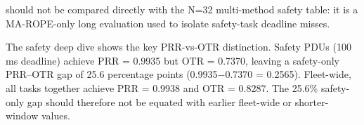  should not be compared directly with the N=32 multi-method safety table: it is a MA-ROPE-only long evaluation used to isolate safety-task deadline misses.

The safety deep dive shows the key PRR-vs-OTR distinction. Safety PDUs (100 ms deadline) achieve PRR = 0.9935 but OTR = 0.7370, leaving a safety-only PRR--OTR gap of 25.6 percentage points (0.9935$-$0.7370 = 0.2565). Fleet-wide, all tasks together achieve PRR = 0.9938 and OTR = 0.8287. The 25.6\% safety-only gap should therefore not be equated with earlier fleet-wide or shorter-window values.
